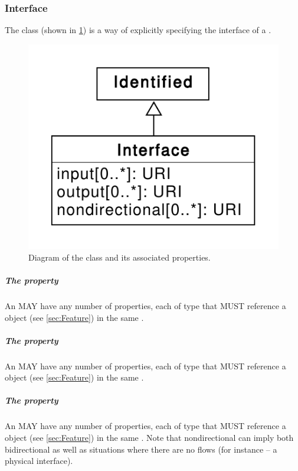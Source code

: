 
\subsubsection{Interface}
\label{sec:Interface}

The  class (shown in \ref{uml:interface}) is a way of explicitly specifying the interface of a . 

\begin{figure}[ht]
\begin{center}
\includegraphics[scale=0.6]{uml/interface}
\caption[]{Diagram of the  class and its associated properties.}
\label{uml:interface}
\end{center}
\end{figure}

\subparagraph{The  property}
\label{sec:input}

An  MAY have any number of  properties, each of type  that MUST reference a  object (see \ref{sec:Feature}) in the same .

\subparagraph{The  property}
\label{sec:output}

An  MAY have any number of  properties, each of type  that MUST reference a  object (see \ref{sec:Feature}) in the same .

\subparagraph{The  property}
\label{sec:nondirectional}

An  MAY have any number of  properties, each of type  that MUST reference a  object (see \ref{sec:Feature}) in the same . Note that nondirectional can imply both bidirectional as well as situations where there are no flows (for instance -- a physical interface).
